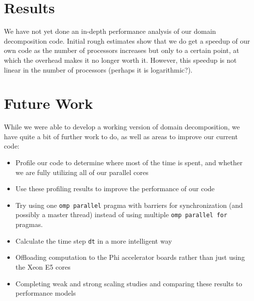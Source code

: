 \documentclass[11pt]{article}
\newcommand{\ttt}{\texttt}
\begin{document}
\section{Results}

We have not yet done an in-depth performance analysis of our domain decomposition code. Initial rough estimates show that we do get a speedup of our own code as the number of processors increases but only to a certain point, at which the overhead makes it no longer worth it. However, this speedup is not linear in the number of processors (perhaps it is logarithmic?).

\section{Future Work}



While we were able to develop a working version of domain decomposition, we have quite a bit of further work to do, as well as areas to improve our current code:
\begin{itemize}
	\item Profile our code to determine where most of the time is spent, and whether we are fully utilizing all of our parallel cores
	\item Use these profiling results to improve the performance of our code
	\item Try using one \ttt{omp parallel} pragma with barriers for synchronization (and possibly a master thread) instead of using multiple \ttt{omp parallel for} pragmas.
	\item Calculate the time step \ttt{dt} in a more intelligent way
	\item Offloading computation to the Phi accelerator boards rather than just using the Xeon E5 cores
	\item Completing weak and strong scaling studies and comparing these results to performance models
\end{itemize}
\end{document}
